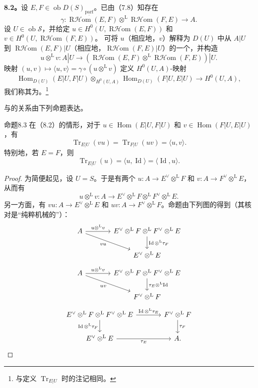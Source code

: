 \textbf{8.2。}设 $E,F\in\operatorname{ob}D(S)_{\underline{\mathrm{parf}}}$。已由（7.8）知存在
\[\gamma:\operatorname{R\mathcal Hom}(E,F)\otimes^{\mathrm L}\operatorname{R\mathcal Hom}(F,E)\longrightarrow A.\]
设 $U\in\operatorname{ob}\mathscr S$，并给定 $u\in H^0(U,\operatorname{R\mathcal Hom}(E,F))$ 和 $v\in H^0(U,\operatorname{R\mathcal Hom}(F,E))$。
可将 $u$（相应地，$v$）解释为 $D(U)$ 中从 $A|U$ 到 $\operatorname{R\mathcal Hom}(E,F)|U$（相应地，$\operatorname{R\mathcal Hom}(F,E)|U$）的一个，并构造
\[u\otimes^{\mathrm L}v:A|U\longrightarrow(\operatorname{R\mathcal Hom}(E,F)\otimes^{\mathrm L}\operatorname{R\mathcal Hom}(F,E))|U.\]
映射 $(u,v)\mapsto\langle u,v\rangle=\gamma\circ(u\otimes^{\mathrm L}v)$ 定义 $H^0(U,A)$-映射
\[\operatorname{Hom}_{D(U)}(E|U,F|U)\otimes_{H^0(U,A)}\operatorname{Hom}_{D(U)}(F|U,E|U)\longrightarrow H^0(U,A),\]
我们称其为。\footnote{与定义 $\operatorname{Tr}_{E|U}$ 时的注记相同。}

与的关系由下列命题表达。
\begin{SGAresult}{命题}{8.3}
在（8.2）的情形，对于 $u\in\operatorname{Hom}(E|U,F|U)$ 和 $v\in\operatorname{Hom}(F|U,E|U)$，有
\[\operatorname{Tr}_{E|U}(vu)=\operatorname{Tr}_{F|U}(uv)=\langle u,v\rangle.\]
特别地，若 $E=F$，则
\[\operatorname{Tr}_{E|U}(u)=\langle u,\operatorname{Id}\rangle=\langle\operatorname{Id},u\rangle.\]
\end{SGAresult}
\begin{proof}
为简便起见，设 $U=S$。于是有两个 $u:A\to E^\vee\otimes^{\mathrm L}F$ 和 $v:A\to F^\vee\otimes^{\mathrm L}E$，从而有
\[u\otimes^{\mathrm L}v:A\longrightarrow E^\vee\otimes^{\mathrm L}F\otimes^{\mathrm L}F^\vee\otimes^{\mathrm L}E.\]
另一方面，有 $vu:A\to E^\vee\otimes^{\mathrm L}E$ 和 $uv:A\to F^\vee\otimes^{\mathrm L}F$。命题由下列图的得到（其核对是“纯粹机械的”）：
\[\begin{tikzcd}[column sep=large]
A\arrow[r,"u\otimes^{\mathrm L}v"]\arrow[dr,"vu"']&E^\vee\otimes^{\mathrm L}F\otimes^{\mathrm L}F^\vee\otimes^{\mathrm L}E\arrow[d,"\operatorname{Id}\otimes^{\mathrm L}\tau_F"]\\
&E^\vee\otimes^{\mathrm L}E
\end{tikzcd}\]
\[\begin{tikzcd}[column sep=large]
A\arrow[r,"u\otimes^{\mathrm L}v"]\arrow[dr,"uv"']&E^\vee\otimes^{\mathrm L}F\otimes^{\mathrm L}F^\vee\otimes^{\mathrm L}E\arrow[d,"\tau_E\otimes^{\mathrm L}\operatorname{Id}"]\\
&F^\vee\otimes^{\mathrm L}F
\end{tikzcd}\]
\[\begin{tikzcd}[column sep=large]
E^\vee\otimes^{\mathrm L}F\otimes^{\mathrm L}F^\vee\otimes^{\mathrm L}E\arrow[r,"\operatorname{Id}\otimes^{\mathrm L}\tau_E"]\arrow[d,"\operatorname{Id}\otimes^{\mathrm L}\tau_F"']&F^\vee\otimes^{\mathrm L}F\arrow[d,"\tau_F"]\\
E^\vee\otimes^{\mathrm L}E\arrow[r,"\tau_E"']&A.
\end{tikzcd}\]
\end{proof}

